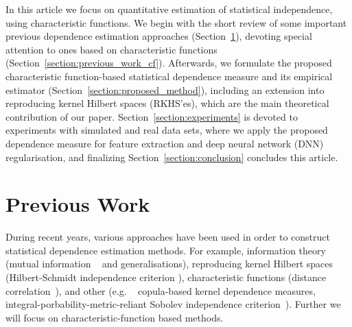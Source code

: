 \documentclass{article}
\begin{document}
In this article we focus on quantitative estimation of statistical independence, using characteristic functions. We begin with the short review of some important previous dependence estimation approaches (Section~\ref{section:previous_work}), devoting special attention to ones based on characteristic functions (Section~\ref{section:previous_work_cf}). Afterwards, we formulate the proposed characteristic function-based statistical dependence measure and its empirical estimator (Section~\ref{section:proposed_method}), including an extension into reproducing kernel Hilbert spaces (RKHS'es), which are the main theoretical contribution of our paper. Section~\ref{section:experiments} is devoted to experiments with simulated and real data sets, where we apply the proposed dependence measure for feature extraction and deep neural network (DNN) regularisation,  and finalizing Section~\ref{section:conclusion} concludes this article.

\section{Previous Work}
\label{section:previous_work}
During recent years, various approaches have been used in order to construct statistical dependence estimation methods. For example, information theory (mutual information ~\cite{Cover2006} and generalisations), reproducing kernel Hilbert spaces (Hilbert-Schmidt independence criterion \cite{Gretton2005MeasuringSD}), characteristic functions (distance correlation~\cite{Feuerverger, Szekely}), and other (e.g. ~\cite{Pczos2012CopulabasedKD} copula-based kernel dependence measures, integral-porbability-metric-reliant Sobolev independence criterion~\cite{NIPS2019_9147}).
Further we will focus on characteristic-function based methods. 
\end{document}
